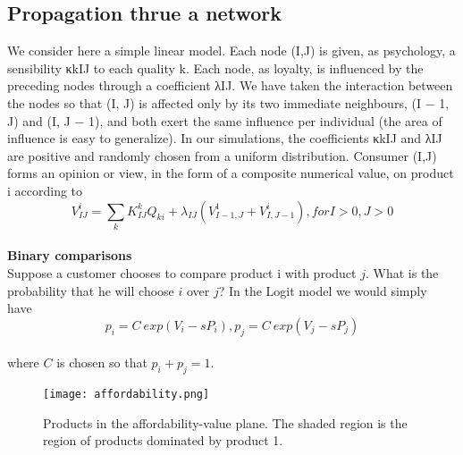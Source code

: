 \subsection{Propagation thrue a network} \label{subsec:propagation}
We consider here a simple linear model. Each node (I,J) is given, as psychology, a sensibility κkIJ to each quality k.
Each node, as loyalty, is influenced by the preceding nodes through a coefficient λIJ.
We have taken the interaction between the nodes so that (I, J) is affected only by its two immediate neighbours,
(I − 1, J) and (I, J − 1), and both exert the same influence per individual (the area of influence is easy to generalize).
In our simulations, the coefficients κkIJ and λIJ are positive and randomly chosen from a uniform distribution.
Consumer (I,J) forms an opinion or view, in the form of a composite numerical value, on product i according to~\cite{pantland}
$$V_{IJ}^{i} = \sum_k K_{IJ}^kQ_{ki} + \lambda_{IJ}(V_{I-1,J}^1+V_{I,J-1}^i), for I > 0, J > 0$$
\\
\textbf{Binary comparisons} \label{subsec:binary}\\
Suppose a customer chooses to compare product i with product $j$.
What is the probability that he will choose $i$ over $j$?
In the Logit model we would simply have~\cite{pantland}
\\
\begin{equation} \label{eq:15}
p_i = C~exp(V_i - sP_i), p_j = C~exp(V_j - sP_j)
\end{equation}
\\
where $C$ is chosen so that $p_i + p_j = 1$.

\begin{figure}[h!]
	\begin{center}
		\texttt{[image: affordability.png]}
	\end{center}
	\caption{Products in the affordability-value plane.
	The shaded region is the region of products dominated by product 1.}
	\label{Affordability of products}
\end{figure}

